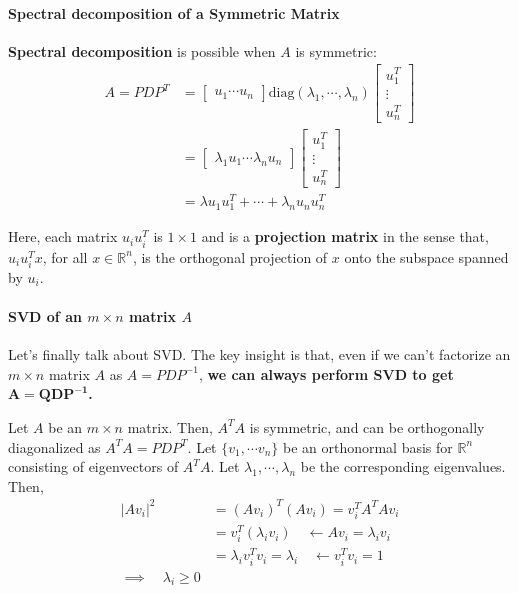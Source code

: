 \documentclass[]{article}
\newcommand{\norm}[1]{\lvert #1 \rvert}
\begin{document}
\paragraph{Spectral decomposition of a Symmetric Matrix \\}
\textbf{Spectral decomposition} is possible when $A$ is symmetric:
\begin{align*}
A = PDP^{T} &= \begin{bmatrix}
u_1 \dotsm u_n
\end{bmatrix} \textrm{diag}(\lambda_1 , \dotsm, \lambda_n) \begin{bmatrix}
u_{1}^{T} \\ \vdots \\ u_{n}^{T}
\end{bmatrix} \\
&= \begin{bmatrix}
\lambda_{1}u_{1} \dotsm \lambda_{n}u_{n} 
\end{bmatrix}\begin{bmatrix}
u_{1}^{T} \\ \vdots \\ u_{n}^{T}
\end{bmatrix} \\
&= \lambda u_{1} u_{1}^{T} + \dotsm + \lambda_{n}u_{n}u_{n}^{T}
\end{align*}

Here, each matrix $u_{i}u_{i}^{T}$ is $1 \times 1$ and is a \textbf{projection matrix} in the sense that, $u_{i}u_{i}^{T}x$, for all $x \in \mathds{R}^{n}$, is the orthogonal projection of $x$ onto the subspace spanned by $u_{i}$.

\paragraph{SVD of an $m \times n$ matrix $A$ \\}

Let's finally talk about SVD. The key insight is that, even if we can't factorize an $m \times n$ matrix $A$ as $A = PDP^{-1}$, \textbf{we can always perform SVD to get $\mathbf{A = QDP^{-1}}$. }

Let $A$ be an $m \times n$ matrix. Then, $A^{T}A$ is symmetric, and can be orthogonally diagonalized as $A^{T}A = PDP^{T}$. Let $\{v_1, \dotsm v_{n} \}$ be an orthonormal basis for $\mathds{R}^{n}$ consisting of eigenvectors of $A^{T}A$. Let $\lambda_{1}, \dotsm, \lambda_{n}$ be the corresponding eigenvalues. Then,
\begin{align*}
\norm{Av_i}^{2} &= (Av_i)^{T}(Av_i) = v_{i}^{T}A^{T}Av_{i} \\
&= v_{i}^{T} (\lambda_{i}v_{i}) \quad \leftarrow Av_{i} = \lambda_{i}v_{i} \\
&= \lambda_{i} v_{i}^{T}v_{i} = \lambda_{i} \quad \leftarrow v_{i}^{T}v_{i} = 1 \\
\implies \quad \lambda_{i} \geq 0
\end{align*}
\end{document}
